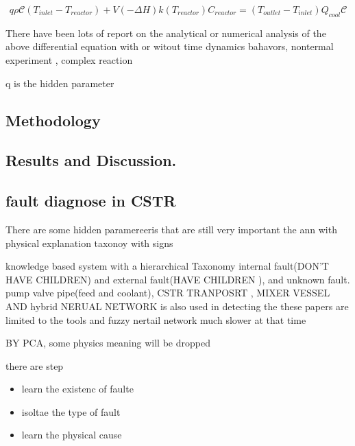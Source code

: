 \documentclass[fleqn,11pt]{wlscirep}
\begin{document}
\begin{equation} 
    q \rho \mathcal{C}(T_{inlet}-T_{reactor})+V(-\Delta H)k(T_{reactor}) C_{reactor}=(T_{outlet}-T_{inlet})Q_{cool} \mathcal{C}
\end{equation}

There have been lots of report on the analytical or numerical analysis of the above differential equation with or witout time \cite{balakotaiah1981analysis}  dynamics bahavors\cite{schmidt1981dynamic}, nontermal \cite{hamer1981dynamic} experiment\cite{teymour1989dynamic,teymour1992dynamic} ,\cite{teymour1992dynamic2}
complex reaction \cite{scott1983reversible,lin1981multiplicity}

q is the hidden parameter



\subsection*{Methodology}
\subsection*{Results and Discussion.}

\subsection*{fault diagnose in CSTR }

There are some hidden paramereeris that are still very important 
the ann\cite{hoskins1991fault} with physical explanation
taxonoy with signs\cite{chang1990line}

knowledge based system with a hierarchical Taxonomy  \cite{terpstra1992real}
internal fault(DON'T HAVE CHILDREN) and external fault(HAVE CHILDREN ), and unknown fault. pump valve pipe(feed and coolant), CSTR TRANPOSRT , MIXER VESSEL AND 
hybrid NERUAL NETWORK is also used in detecting the \cite{ozyurt1996hybrid}
these papers are  limited to the tools and 
fuzzy nertail network\cite{zhang1996process} much slower at that time

BY PCA, some physics meaning will be dropped 

there are step
\begin{itemize}
    \item learn the existenc of faulte
    \item isoltae the type of fault
    \item learn the physical cause
\end{itemize}
\end{document}
